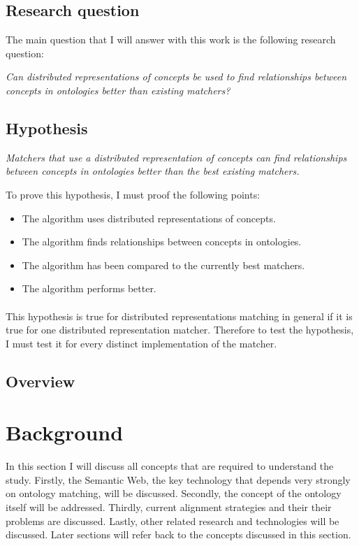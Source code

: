 \documentclass{article}
\begin{document}
 \subsection{Research question} \label{researchquestion}
 The main question that I will answer with this work is the following research question:
 
 \begin{center}
 \textit{
 Can distributed representations of concepts be used to find relationships between concepts in ontologies better than existing matchers?
 }
 \end{center}
 
 \subsection{Hypothesis} \label{hypotheses}
 
 \begin{center}
 \textit{Matchers that use a distributed representation of concepts can find relationships between concepts in ontologies better than the best existing matchers.}
 \end{center}

 To prove this hypothesis, I must proof the following points:
 \begin{itemize}
 \item The algorithm uses distributed representations of concepts.
 \item The algorithm finds relationships between concepts in ontologies.
 \item The algorithm has been compared to the currently best matchers.
 \item The algorithm performs better.
 \end{itemize} 
 
 \paragraph{}
 This hypothesis is true for distributed representations matching in general if it is true for one distributed representation matcher. Therefore to test the hypothesis, I must test it for every distinct implementation of the matcher.
 
 \subsection{Overview} %

 
\newpage
\section{Background}
 In this section I will discuss all concepts that are required to understand the study. Firstly, the Semantic Web, the key technology that depends very strongly on ontology matching, will be discussed. Secondly, the concept of the ontology itself will be addressed. Thirdly, current alignment strategies and their their problems are discussed. Lastly, other related research and technologies will be discussed. Later sections will refer back to the concepts discussed in this section.
\end{document}
